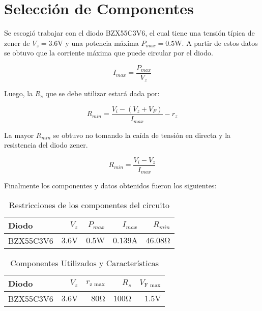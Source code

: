 \begin{figure}[ht]
    \begin{center}
        
        \label{fig:limitador_activado}
    \end{center}
\end{figure}

\section{Selección de Componentes}

Se escogió trabajar con el diodo BZX55C3V6, el cual tiene una tensión típica de zener de $V_z = 3.6 \si{\volt}$ y una potencia máxima $P_{max} = 0.5 \si{\watt}$. A partir de estos datos se obtuvo que la corriente máxima que puede circular por el diodo.

\begin{equation}
    I_{max}=\frac{P_{max}}{V_z}
\end{equation}

Luego, la $R_s$ que se debe utilizar estará dada por:

\begin{equation}
    R_{min}=\frac{V_i-(V_z+V_F)}{I_{max}}-r_z
\end{equation}

La mayor $R_{min}$ se obtuvo no tomando la caída de tensión en directa y la resistencia del diodo zener.

\begin{equation}
    R_{min}=\frac{V_i-V_z}{I_{max}}
\end{equation}

Finalmente los componentes y datos obtenidos fueron los siguientes:

\begin{table}[ht]
    \begin{center}
        \begin{tabular}{|l|r|r|r|r|}
            \hline
            Diodo & $V_z$ & $P_{max}$ & $I_{max}$ & $R_{min}$ \\
            \hline
            BZX55C3V6 & $3.6 \si{\volt}$ & $0.5 \si{\watt}$ & $0.139 \si{\ampere}$ & $46.08 \si{\ohm}$ \\
            \hline
        \end{tabular}
        \caption{Restricciones de los componentes del circuito}
    \end{center}
\end{table}

\begin{table}[ht]
    \begin{center}
        \begin{tabular}{|l|r|r|r|r|}
            \hline
            Diodo & $V_z$ & $r_{\text{z max}}$ & $R_s$ & $V_{\text{F max}}$\\
            \hline
            BZX55C3V6 & $3.6 \si{\volt}$ & $80 \si{\ohm}$ & $100 \si{\ohm}$ & $1.5 \si{\volt}$ \\
            \hline
        \end{tabular}
        \caption{Componentes Utilizados y Características}
    \end{center}
\end{table}

